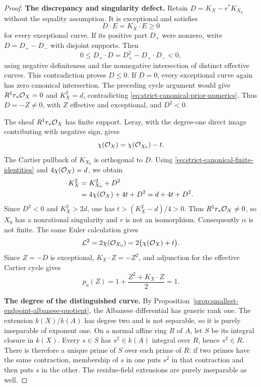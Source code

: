 \begin{proof}
\par\smallskip\noindent\textbf{The discrepancy and singularity defect.}
Retain $D=K_X-r^*K_{X_0}$ without the equality assumption.
It is exceptional and satisfies
\[
 D\cdot E=K_X\cdot E\ge0
\]
for every exceptional curve.
If its positive part $D_+$ were nonzero, write
$D=D_+-D_-$ with disjoint supports.  Then
\[
 0\le D_+\cdot D=D_+^2-D_+\cdot D_-<0,
\]
using negative definiteness and the nonnegative intersection
of distinct effective curves.  This contradiction proves $D\le0$.
If $D=0$, every exceptional curve again has zero canonical
intersection.  The preceding cycle argument would give
$R^1r_*\mathcal O_X=0$ and $K_X^2=d$, contradicting
\eqref{eq:strict-canonical-prior-numerics}.
Thus $D=-Z\ne0$, with $Z$ effective and exceptional, and $D^2<0$.

The sheaf $R^1r_*\mathcal O_X$ has finite support.  Leray, with the
degree-one direct image contributing with negative sign, gives
\[
 \chi(\mathcal O_X)=\chi(\mathcal O_{X_0})-t.
\]
The Cartier pullback of $K_{X_0}$ is orthogonal to $D$.
Using \eqref{eq:strict-canonical-finite-identities} and
$4\chi(\mathcal O_X)=d$, we obtain
\[
 \begin{split}
 K_X^2
 &=K_{X_0}^2+D^2\\
 &=4\chi(\mathcal O_X)+4t+D^2
 =d+4t+D^2.
 \end{split}
\]
Since $D^2<0$ and $K_X^2>2d$, one has
$t>(K_X^2-d)/4>0$.
Thus $R^1r_*\mathcal O_X\ne0$, so $X_0$ has a nonrational
singularity and $r$ is not an isomorphism.
Consequently $\alpha$ is not finite.
The same Euler calculation gives
\[
 \mathcal L^2
 =2\chi(\mathcal O_{X_0})
 =2\bigl(\chi(\mathcal O_X)+t\bigr).
\]
Since $Z=-D$ is exceptional, $K_X\cdot Z=-Z^2$, and adjunction
for the effective Cartier cycle gives
\[
 p_a(Z)=1+\frac{Z^2+K_X\cdot Z}{2}=1.
\]

\par\smallskip\noindent\textbf{The degree of the distinguished curve.}
By Proposition~\ref{prop:smallest-endpoint-albanese-quotient},
the Albanese differential has generic rank one.
The extension $k(X)/k(A)$ has degree two and is not separable,
so it is purely inseparable of exponent one.
On a normal affine ring $R$ of $A$, let $S$ be its integral
closure in $k(X)$.
Every $s\in S$ has $s^2\in k(A)$ integral over $R$, hence
$s^2\in R$.
There is therefore a unique prime of $S$ over each prime of $R$:
if two primes have the same contraction, membership of $s$ in
one puts $s^2$ in that contraction and then puts $s$ in the other.
The residue-field extensions are purely inseparable as well.


\end{proof}
